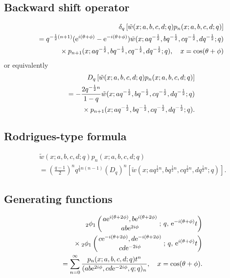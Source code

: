 \documentclass[envcountchap,graybox]{svmono}
\newcommand{\qhyp}[5]{\mbox{}_{#1}{\phi}_{#2}
\left(\genfrac{}{}{0pt}{}{#3}{#4}\,;\,q,\,#5\right)}
\newcommand{\mathindent}{\hspace{7.5mm}}
\newcommand{\e}{\textrm{e}}
\newcommand{\qhyp}[5]{\,\mbox{}_{#1}\phi_{#2}\!\left(
  \genfrac{}{}{0pt}{}{#3}{#4};#5\right)}
\begin{document}
\subsection*{Backward shift operator}
\begin{eqnarray}
\label{shift2ContqHahnI}
& &\delta_q\left[{\tilde w}(x;a,b,c,d;q)p_n(x;a,b,c,d;q)\right]\nonumber\\
& &{}=q^{-\frac{1}{2}(n+1)}(\e^{i(\theta+\phi)}-\e^{-i(\theta+\phi)})
{\tilde w}(x;aq^{-\frac{1}{2}},bq^{-\frac{1}{2}},cq^{-\frac{1}{2}},dq^{-\frac{1}{2}};q)\nonumber\\
& &{}\mathindent{}\times p_{n+1}(x;aq^{-\frac{1}{2}},bq^{-\frac{1}{2}},cq^{-\frac{1}{2}},dq^{-\frac{1}{2}};q),
\quad x=\cos(\theta+\phi)
\end{eqnarray}
or equivalently
\begin{eqnarray}
\label{shift2ContqHahnII}
& &D_q\left[{\tilde w}(x;a,b,c,d;q)p_n(x;a,b,c,d;q)\right]\nonumber\\
& &{}=-\frac{2q^{-\frac{1}{2}n}}{1-q}{\tilde w}(x;aq^{-\frac{1}{2}},bq^{-\frac{1}{2}},cq^{-\frac{1}{2}},dq^{-\frac{1}{2}};q)\nonumber\\
& &{}\mathindent{}\times p_{n+1}(x;aq^{-\frac{1}{2}},bq^{-\frac{1}{2}},cq^{-\frac{1}{2}},dq^{-\frac{1}{2}};q).
\end{eqnarray}

\subsection*{Rodrigues-type formula}
\begin{eqnarray}
\label{RodContqHahn}
& &{\tilde w}(x;a,b,c,d;q)p_n(x;a,b,c,d;q)\nonumber\\
& &{}=\left(\frac{q-1}{2}\right)^nq^{\frac{1}{4}n(n-1)}\left(D_q\right)^n
\left[{\tilde w}(x;aq^{\frac{1}{2}n},bq^{\frac{1}{2}n},cq^{\frac{1}{2}n},dq^{\frac{1}{2}n};q)\right].
\end{eqnarray}

\subsection*{Generating functions}
\begin{eqnarray}
\label{GenContqHahn1}
& &\qhyp{2}{1}{a\e^{i(\theta+2\phi)},b\e^{i(\theta+2\phi)}}{ab\e^{2i\phi}}{\e^{-i(\theta+\phi)}t}\nonumber\\
& &{}\mathindent\times
\qhyp{2}{1}{c\e^{-i(\theta+2\phi)},d\e^{-i(\theta+2\phi)}}{cd\e^{-2i\phi}}{\e^{i(\theta+\phi)}t}\nonumber\\
& &{}=\sum_{n=0}^{\infty}\frac{p_n(x;a,b,c,d;q)t^n}{(ab\e^{2i\phi},cd\e^{-2i\phi},q;q)_n},
\quad x=\cos(\theta+\phi).
\end{eqnarray}
\end{document}
